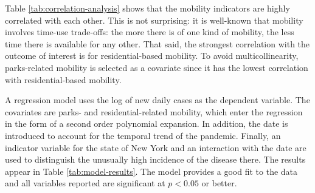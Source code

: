 \documentclass[]{elsarticle} %
\begin{document}
Table \ref{tab:correlation-analysis} shows that the mobility indicators
are highly correlated with each other. This is not surprising: it is
well-known that mobility involves time-use trade-offs: the more there is
of one kind of mobility, the less time there is available for any other.
That said, the strongest correlation with the outcome of interest is for
residential-based mobility. To avoid multicollinearity, parks-related
mobility is selected as a covariate since it has the lowest correlation
with residential-based mobility.

\begin{table}[!h]

\caption{\label{tab:check-correlations}\label{tab:correlation-analysis}Simple correlation between log(New Cases) and the mobility indicators}
\centering
{}
\end{table}

A regression model uses the log of new daily cases as the dependent
variable. The covariates are parks- and residential-related mobility,
which enter the regression in the form of a second order polynomial
expansion. In addition, the date is introduced to account for the
temporal trend of the pandemic. Finally, an indicator variable for the
state of New York and an interaction with the date are used to
distinguish the unusually high incidence of the disease there. The
results appear in Table \ref{tab:model-results}. The model provides a
good fit to the data and all variables reported are significant at
\(p<0.05\) or better.
\end{document}
